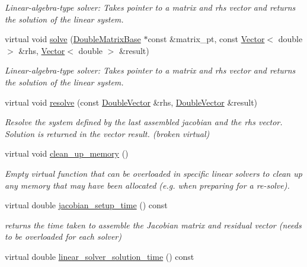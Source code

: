 \begin{DoxyCompactItemize}
\begin{DoxyCompactList}\small\item\em Linear-\/algebra-\/type solver\+: Takes pointer to a matrix and rhs vector and returns the solution of the linear system. \end{DoxyCompactList}\item 
virtual void \hyperlink{classoomph_1_1LinearSolver_a1f7a2ee2cd18d3dafc20a61ca2f52dbb}{solve} (\hyperlink{classoomph_1_1DoubleMatrixBase}{Double\+Matrix\+Base} $\ast$const \&matrix\+\_\+pt, const \hyperlink{classoomph_1_1Vector}{Vector}$<$ double $>$ \&rhs, \hyperlink{classoomph_1_1Vector}{Vector}$<$ double $>$ \&result)
\begin{DoxyCompactList}\small\item\em Linear-\/algebra-\/type solver\+: Takes pointer to a matrix and rhs vector and returns the solution of the linear system. \end{DoxyCompactList}\item 
virtual void \hyperlink{classoomph_1_1LinearSolver_a3b310d08333033edc119b2a5bd7dcbfb}{resolve} (const \hyperlink{classoomph_1_1DoubleVector}{Double\+Vector} \&rhs, \hyperlink{classoomph_1_1DoubleVector}{Double\+Vector} \&result)
\begin{DoxyCompactList}\small\item\em Resolve the system defined by the last assembled jacobian and the rhs vector. Solution is returned in the vector result. (broken virtual) \end{DoxyCompactList}\item 
virtual void \hyperlink{classoomph_1_1LinearSolver_a9d66f3262e80ca06a365f98216afd85f}{clean\+\_\+up\+\_\+memory} ()
\begin{DoxyCompactList}\small\item\em Empty virtual function that can be overloaded in specific linear solvers to clean up any memory that may have been allocated (e.\+g. when preparing for a re-\/solve). \end{DoxyCompactList}\item 
virtual double \hyperlink{classoomph_1_1LinearSolver_a0fedfb9d9855d0e998c0e32140bc56d4}{jacobian\+\_\+setup\+\_\+time} () const
\begin{DoxyCompactList}\small\item\em returns the time taken to assemble the Jacobian matrix and residual vector (needs to be overloaded for each solver) \end{DoxyCompactList}\item 
virtual double \hyperlink{classoomph_1_1LinearSolver_a3c66f77db812a9c196478c7e2f77ef09}{linear\+\_\+solver\+\_\+solution\+\_\+time} () const

\end{DoxyCompactItemize}
